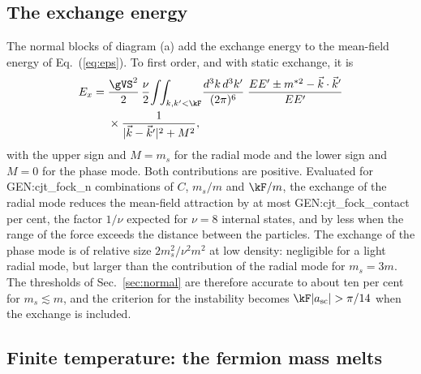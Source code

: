 \subsection{The exchange energy}
\label{sec:exchange}

The normal blocks of diagram (a) add the exchange energy to the mean-field energy of
Eq.~(\ref{eq:eps}). To first order, and with static exchange, it is
\begin{align}
E_x={}&\frac{\gVS^2}{2}\,\frac\nu2\!\int\!\!\int_{k,k'<\kF}\!\frac{d^3k\,d^3k'}{(2\pi)^6}\;
\frac{EE'\pm m^{*2}-\vec k\cdot\vec k'}{EE'}\nonumber\\
&\times\frac{1}{|\vec k-\vec k'|^2+M^2},
\label{eq:fock}
\end{align}
with the upper sign and $M=m_s$ for the radial mode and the lower sign and $M=0$ for the phase mode.
Both contributions are positive. Evaluated for {{GEN:cjt_fock_n}} combinations of $C$, $m_s/m$ and $\kF/m$, the
exchange of the radial mode reduces the mean-field attraction by at most {{GEN:cjt_fock_contact}}
per cent, the factor $1/\nu$ expected for $\nu=8$ internal states, and by less when the range of the
force exceeds the distance between the particles. The exchange of the phase mode is of relative size
$2m_s^2/\nu^2m^2$ at low density: negligible for a light radial mode, but larger than the
contribution of the radial mode for $m_s=3m$. The thresholds of Sec.~\ref{sec:normal} are therefore
accurate to about ten per cent for $m_s\lesssim m$, and the criterion for the instability becomes
$\kF|a_{\rm sc}|>\pi/14$ when the exchange is included.

\subsection{Finite temperature: the fermion mass melts}
\label{sec:thermal}

